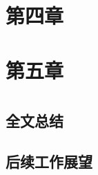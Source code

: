 \documentclass[master]{thesis}
\theoremstyle{definition} %
\begin{document}
\chapter{第四章}

\chapter{第五章}

\thesisChapterConclusion
\chapter{}

\section{全文总结}


\section{后续工作展望}




\end{document}
